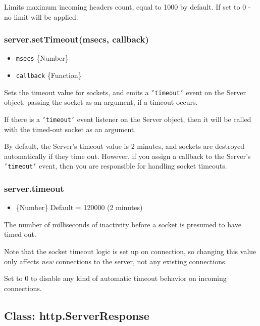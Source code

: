 Limits maximum incoming headers count, equal to 1000 by default. If set
to 0 - no limit will be applied.

\subsubsection{server.setTimeout(msecs,
callback)}\label{server.settimeoutmsecs-callback}

\begin{itemize}
\itemsep1pt\parskip0pt
\item
  \texttt{msecs} \{Number\}
\item
  \texttt{callback} \{Function\}
\end{itemize}

Sets the timeout value for sockets, and emits a \texttt{'timeout'} event
on the Server object, passing the socket as an argument, if a timeout
occurs.

If there is a \texttt{'timeout'} event listener on the Server object,
then it will be called with the timed-out socket as an argument.

By default, the Server's timeout value is 2 minutes, and sockets are
destroyed automatically if they time out. However, if you assign a
callback to the Server's \texttt{'timeout'} event, then you are
responsible for handling socket timeouts.

\subsubsection{server.timeout}\label{server.timeout}

\begin{itemize}
\itemsep1pt\parskip0pt
\item
  \{Number\} Default = 120000 (2 minutes)
\end{itemize}

The number of milliseconds of inactivity before a socket is presumed to
have timed out.

Note that the socket timeout logic is set up on connection, so changing
this value only affects \emph{new} connections to the server, not any
existing connections.

Set to 0 to disable any kind of automatic timeout behavior on incoming
connections.

\subsection{Class: http.ServerResponse}\label{class-http.serverresponse}

